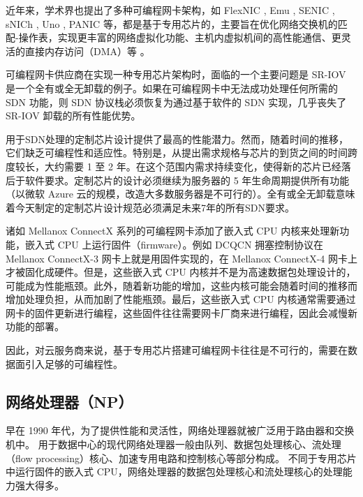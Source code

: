 近年来，学术界也提出了多种可编程网卡架构，如 FlexNIC \cite{kaufmann2015flexnic,kaufmann2016high}, Emu \cite{sultana2017emu}, SENIC \cite{radhakrishnan2014senic}, sNICh \cite{ram2010snich}, Uno \cite{le2017uno}, PANIC \cite{stephens2018your} 等，都是基于专用芯片的，主要旨在优化网络交换机的匹配-操作表，实现更丰富的网络虚拟化功能、主机内虚拟机间的高性能通信、更灵活的直接内存访问（DMA）等 \cite{kaufmann2015flexnic,kaufmann2016high}。

可编程网卡供应商在实现一种专用芯片架构时，面临的一个主要问题是 SR-IOV 是一个全有或全无卸载的例子。如果在可编程网卡中无法成功处理任何所需的 SDN 功能，则 SDN 协议栈必须恢复为通过基于软件的 SDN 实现，几乎丧失了 SR-IOV 卸载的所有性能优势。

用于SDN处理的定制芯片设计提供了最高的性能潜力。然而，随着时间的推移，它们缺乏可编程性和适应性。特别是，从提出需求规格与芯片的到货之间的时间跨度较长，大约需要 1 至 2 年。在这个范围内需求持续变化，使得新的芯片已经落后于软件要求。定制芯片的设计必须继续为服务器的 5 年生命周期提供所有功能（以微软 Azure 云的规模，改造大多数服务器是不可行的）。全有或全无卸载意味着今天制定的定制芯片设计规范必须满足未来7年的所有SDN要求。

诸如 Mellanox ConnectX 系列的可编程网卡添加了嵌入式 CPU 内核来处理新功能，嵌入式 CPU 上运行固件（firmware）。例如 DCQCN 拥塞控制协议在 Mellanox ConnectX-3 网卡上就是用固件实现的，在 Mellanox ConnectX-4 网卡上才被固化成硬件。但是，这些嵌入式 CPU 内核并不是为高速数据包处理设计的，可能成为性能瓶颈。此外，随着新功能的增加，这些内核可能会随着时间的推移而增加处理负担，从而加剧了性能瓶颈。最后，这些嵌入式 CPU 内核通常需要通过网卡的固件更新进行编程，这些固件往往需要网卡厂商来进行编程，因此会减慢新功能的部署。

因此，对云服务商来说，基于专用芯片搭建可编程网卡往往是不可行的，需要在数据面引入足够的可编程性。






\subsection{网络处理器（NP）}
\label{smartnic-np}

早在 1990 年代，为了提供性能和灵活性，网络处理器就被广泛用于路由器和交换机中。
用于数据中心的现代网络处理器一般由队列、数据包处理核心、流处理（flow processing）核心、加速专用电路和控制核心等部分构成。
不同于专用芯片中运行固件的嵌入式 CPU，网络处理器的数据包处理核心和流处理核心的处理能力强大得多。

